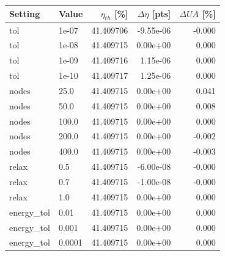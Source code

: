 \begin{tabular}{@{}llrrr@{}}
\toprule
Setting & Value & $\eta_{th}$ [\%] & $\Delta\eta$ [pts] & $\Delta UA$ [\%] \\
\midrule
tol & 1e-07 & 41.409706 & -9.55e-06 & -0.000 \\
tol & 1e-08 & 41.409715 & 0.00e+00 & 0.000 \\
tol & 1e-09 & 41.409716 & 1.15e-06 & 0.000 \\
tol & 1e-10 & 41.409717 & 1.25e-06 & 0.000 \\
nodes & 25.0 & 41.409715 & 0.00e+00 & 0.041 \\
nodes & 50.0 & 41.409715 & 0.00e+00 & 0.008 \\
nodes & 100.0 & 41.409715 & 0.00e+00 & 0.000 \\
nodes & 200.0 & 41.409715 & 0.00e+00 & -0.002 \\
nodes & 400.0 & 41.409715 & 0.00e+00 & -0.003 \\
relax & 0.5 & 41.409715 & -6.00e-08 & -0.000 \\
relax & 0.7 & 41.409715 & -1.00e-08 & -0.000 \\
relax & 1.0 & 41.409715 & 0.00e+00 & 0.000 \\
energy\_tol & 0.01 & 41.409715 & 0.00e+00 & 0.000 \\
energy\_tol & 0.001 & 41.409715 & 0.00e+00 & 0.000 \\
energy\_tol & 0.0001 & 41.409715 & 0.00e+00 & 0.000 \\
\bottomrule
\end{tabular}
